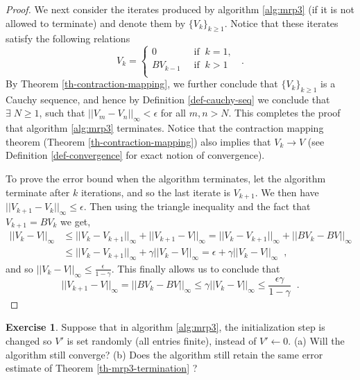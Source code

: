 \documentclass{article}
\theoremstyle{definition}
\newtheorem{exercise}{Exercise}[section]
\theoremstyle{remark}
\begin{document}
\begin{proof}
We next consider the iterates produced by algorithm \ref{alg:mrp3} (if it is not allowed to terminate) and denote them by $\{V_k\}_{k \geq 1}$. Notice that these iterates satisfy the following relations
\begin{equation}
V_k = 
\begin{cases}
0 \;\; & \text{if} \;\; k = 1, \\
BV_{k-1} \;\; & \text{if} \;\; k > 1 \\
\end{cases}
\;\;.
\label{eq:mrp3-term-proof-eq4}
\end{equation}
By Theorem \ref{th-contraction-mapping}, we further conclude that $\{V_k\}_{k \geq 1}$ is a Cauchy sequence, and hence by Definition \ref{def-cauchy-seq} we conclude that $\exists \; N \geq 1$, such that $||V_m - V_n||_{\infty} < \epsilon$ for all $m,n > N$. This completes the proof that algorithm \ref{alg:mrp3} terminates. Notice that the contraction mapping theorem (Theorem \ref{th-contraction-mapping}) also implies that $V_k \rightarrow V$ (see Definition \ref{def-convergence} for exact notion of convergence).

To prove the error bound when the algorithm terminates, let the algorithm terminate after $k$ iterations, and so the last iterate is $V_{k+1}$. We then have $||V_{k+1} - V_{k}||_{\infty} \leq \epsilon$. Then using the triangle inequality and the fact that $V_{k+1} = BV_{k}$ we get,
\begin{equation}
\begin{split}
||V_{k} - V||_{\infty} & \leq ||V_{k} - V_{k+1}||_{\infty} + ||V_{k+1} - V||_{\infty} = ||V_{k} - V_{k+1}||_{\infty} + ||BV_{k} - BV||_{\infty} \\
&\leq ||V_{k} - V_{k+1}||_{\infty} + \gamma ||V_{k} - V||_{\infty} = \epsilon + \gamma ||V_{k} - V||_{\infty} \;\;,
\end{split}
\label{eq:mrp3-term-proof-eq5}
\end{equation}
and so $||V_{k} - V||_{\infty} \leq \frac{\epsilon}{1 - \gamma}$. This finally allows us to conclude that 
\begin{equation}
||V_{k+1} - V||_{\infty} = ||BV_{k} - BV||_{\infty} \leq \gamma ||V_{k} - V||_{\infty} \leq \frac{\epsilon \gamma}{1 - \gamma}\;\;.
\label{eq:mrp3-term-proof-eq6}
\end{equation}
\end{proof}

\begin{exercise}
Suppose that in algorithm \ref{alg:mrp3}, the initialization step is changed so $V'$ is set randomly (all entries finite), instead of $V' \leftarrow 0$. (a) Will the algorithm still converge? (b) Does the algorithm still retain the same error estimate of Theorem \ref{th-mrp3-termination} ?
\label{ex-mrp3-nonzero-init}
\end{exercise}
\end{document}
